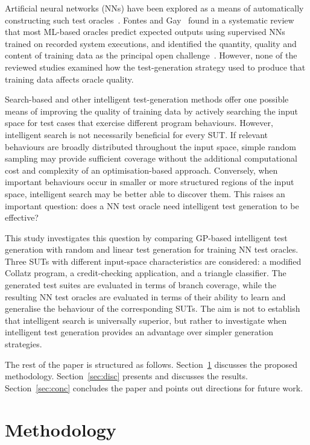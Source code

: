 \documentclass[runningheads]{llncs}
\begin{document}
Artificial neural networks (NNs) have been explored as a means of automatically constructing such test oracles~\cite{vanmali2002using,ye2006automated}. Fontes and Gay~\cite{fontes2021using} found in a systematic review that most ML-based oracles predict expected outputs using supervised NNs trained on recorded system executions, and identified the quantity,  quality and content of training data as the principal open challenge~\cite{fontes2021using,hossain2023neural}. However, none of the reviewed studies examined how the test-generation strategy used to produce that training data affects oracle quality.

Search-based and other intelligent test-generation methods offer one possible means of improving the quality of training data by actively searching the input space for test cases that exercise different program behaviours. However, intelligent search is not necessarily beneficial for every SUT. If relevant behaviours are broadly distributed throughout the input space, simple random sampling may provide sufficient coverage without the additional computational cost and complexity of an optimisation-based approach. Conversely, when important behaviours occur in smaller or more structured regions of the input space, intelligent search may be better able to discover them. This raises an important question: does a NN test oracle need intelligent test generation to be effective?

This study investigates this question by comparing GP-based intelligent test generation with random and linear test generation for training NN test oracles. Three SUTs with different input-space characteristics are considered: a modified Collatz program, a credit-checking application, and a triangle classifier. The generated test suites are evaluated in terms of branch coverage, while the resulting NN test oracles are evaluated in terms of their ability to learn and generalise the behaviour of the corresponding SUTs. The aim is not to establish that intelligent search is universally superior, but rather to investigate when intelligent test generation provides an advantage over simpler generation strategies.

The rest of the paper is structured as follows. Section~\ref{sec:meth} discusses the proposed methodology. Section~\ref{sec:disc} presents and discusses the results. Section~\ref{sec:conc} concludes the paper and points out directions for future work.

\section{Methodology} \label{sec:meth}
\end{document}
